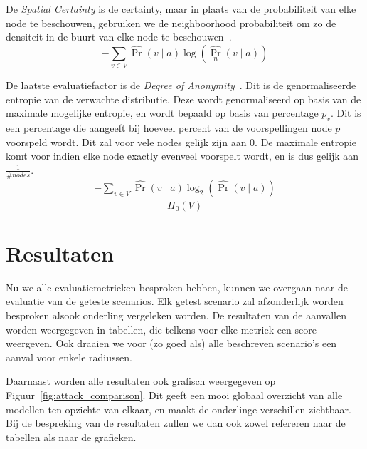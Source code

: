De \textit{Spatial Certainty} is de certainty, maar in plaats van de
probabiliteit van elke node te beschouwen, gebruiken we de neighboorhood
probabiliteit om zo de densiteit in de buurt van elke node te
beschouwen~\cite{Dhondt}.
\begin{equation}
    -\sum_{v \in V} \widehat{\operatorname{Pr}}(v \mid a) \log \left(\widehat{\operatorname{Pr}_n}(v \mid a)\right)\label{eq:spatial_certainty}
\end{equation}

De laatste evaluatiefactor is de \textit{Degree of
    Anonymity}~\cite{Dhondt,Verdonck_2022}. Dit is de genormaliseerde entropie van
de verwachte distributie. Deze wordt genormaliseerd op basis van de maximale
mogelijke entropie, en wordt bepaald op basis van percentage $p_v$. Dit is een
percentage die aangeeft bij hoeveel percent van de voorspellingen node $p$
voorspeld wordt. Dit zal voor vele nodes gelijk zijn aan 0. De maximale
entropie komt voor indien elke node exactly evenveel voorspelt wordt, en is dus
gelijk aan $\frac{1}{\# nodes}$.
\begin{equation}
    \frac{-\sum_{v \in V} \widehat{\operatorname{Pr}}(v \mid a) \log _2(\widehat{\operatorname{Pr}}(v \mid a))}{H_0(V)}\label{eq:degree_of_anonymity}
\end{equation}

\section{Resultaten}
Nu we alle evaluatiemetrieken besproken hebben, kunnen we overgaan naar de
evaluatie van de geteste scenarios. Elk getest scenario zal afzonderlijk worden
besproken alsook onderling vergeleken worden. De resultaten van de aanvallen
worden weergegeven in tabellen, die telkens voor elke metriek een score
weergeven. Ook draaien we voor (zo goed als) alle beschreven scenario's een
aanval voor enkele radiussen.

Daarnaast worden alle resultaten ook grafisch weergegeven op
Figuur~\ref{fig:attack_comparison}. Dit geeft een mooi globaal overzicht van
alle modellen ten opzichte van elkaar, en maakt de onderlinge verschillen
zichtbaar. Bij de bespreking van de resultaten zullen we dan ook zowel
refereren naar de tabellen als naar de grafieken.

